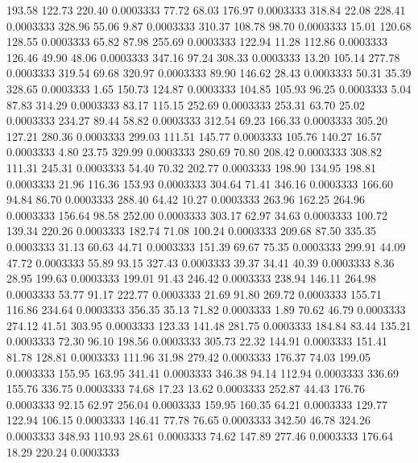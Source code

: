  193.58  122.73  220.40   0.0003333
  77.72   68.03  176.97   0.0003333
 318.84   22.08  228.41   0.0003333
 328.96   55.06    9.87   0.0003333
 310.37  108.78   98.70   0.0003333
  15.01  120.68  128.55   0.0003333
  65.82   87.98  255.69   0.0003333
 122.94   11.28  112.86   0.0003333
 126.46   49.90   48.06   0.0003333
 347.16   97.24  308.33   0.0003333
  13.20  105.14  277.78   0.0003333
 319.54   69.68  320.97   0.0003333
  89.90  146.62   28.43   0.0003333
  50.31   35.39  328.65   0.0003333
   1.65  150.73  124.87   0.0003333
 104.85  105.93   96.25   0.0003333
   5.04   87.83  314.29   0.0003333
  83.17  115.15  252.69   0.0003333
 253.31   63.70   25.02   0.0003333
 234.27   89.44   58.82   0.0003333
 312.54   69.23  166.33   0.0003333
 305.20  127.21  280.36   0.0003333
 299.03  111.51  145.77   0.0003333
 105.76  140.27   16.57   0.0003333
   4.80   23.75  329.99   0.0003333
 280.69   70.80  208.42   0.0003333
 308.82  111.31  245.31   0.0003333
  54.40   70.32  202.77   0.0003333
 198.90  134.95  198.81   0.0003333
  21.96  116.36  153.93   0.0003333
 304.64   71.41  346.16   0.0003333
 166.60   94.84   86.70   0.0003333
 288.40   64.42   10.27   0.0003333
 263.96  162.25  264.96   0.0003333
 156.64   98.58  252.00   0.0003333
 303.17   62.97   34.63   0.0003333
 100.72  139.34  220.26   0.0003333
 182.74   71.08  100.24   0.0003333
 209.68   87.50  335.35   0.0003333
  31.13   60.63   44.71   0.0003333
 151.39   69.67   75.35   0.0003333
 299.91   44.09   47.72   0.0003333
  55.89   93.15  327.43   0.0003333
  39.37   34.41   40.39   0.0003333
   8.36   28.95  199.63   0.0003333
 199.01   91.43  246.42   0.0003333
 238.94  146.11  264.98   0.0003333
  53.77   91.17  222.77   0.0003333
  21.69   91.80  269.72   0.0003333
 155.71  116.86  234.64   0.0003333
 356.35   35.13   71.82   0.0003333
   1.89   70.62   46.79   0.0003333
 274.12   41.51  303.95   0.0003333
 123.33  141.48  281.75   0.0003333
 184.84   83.44  135.21   0.0003333
  72.30   96.10  198.56   0.0003333
 305.73   22.32  144.91   0.0003333
 151.41   81.78  128.81   0.0003333
 111.96   31.98  279.42   0.0003333
 176.37   74.03  199.05   0.0003333
 155.95  163.95  341.41   0.0003333
 346.38   94.14  112.94   0.0003333
 336.69  155.76  336.75   0.0003333
  74.68   17.23   13.62   0.0003333
 252.87   44.43  176.76   0.0003333
  92.15   62.97  256.04   0.0003333
 159.95  160.35   64.21   0.0003333
 129.77  122.94  106.15   0.0003333
 146.41   77.78   76.65   0.0003333
 342.50   46.78  324.26   0.0003333
 348.93  110.93   28.61   0.0003333
  74.62  147.89  277.46   0.0003333
 176.64   18.29  220.24   0.0003333
